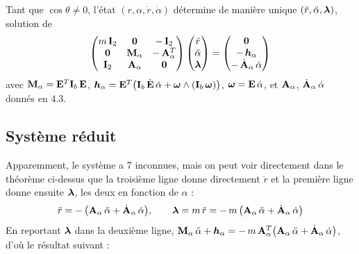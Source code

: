 \begin{theoreme}
    Tant que $\cos\theta \neq 0$, l'état $(r,\alpha,\dot r,\dot\alpha)$
    détermine de manière unique $(\ddot r,\ddot\alpha,\bm{\lambda})$,
    solution de
    \[
        \begin{pmatrix}
            m\,\mathbf{I}_2 & \mathbf{0} & -\,\mathbf{I}_2\\
            \mathbf{0} & \mathbf{M}_\alpha & -\,\mathbf{A}_\alpha^T\\
            \mathbf{I}_2 & \mathbf{A}_\alpha & \mathbf{0}
        \end{pmatrix}
        \begin{pmatrix}
            \ddot r\\ \ddot\alpha\\ \bm{\lambda}
        \end{pmatrix}
        = \begin{pmatrix}
            \bm{0}\\
            -\,\bm{h}_\alpha\\
            -\,\dot{\mathbf{A}}_\alpha\,\dot\alpha
        \end{pmatrix}
    \]
    avec $\mathbf{M}_\alpha = \mathbf{E}^T\mathbf{I}_b\,\mathbf{E}$,
    $\bm{h}_\alpha = \mathbf{E}^T\bigl(\mathbf{I}_b\,\dot{\mathbf{E}}\,\dot\alpha
    + \bm{\omega}\wedge(\mathbf{I}_b\,\bm{\omega})\bigr)$,
    $\bm{\omega} = \mathbf{E}\,\dot\alpha$, et $\mathbf{A}_\alpha$,
    $\dot{\mathbf{A}}_\alpha\,\dot\alpha$ donnés en 4.3.
\end{theoreme}

\subsection{Système réduit}

Apparemment, le système a 7 inconnues, mais on peut voir directement dans le théorème ci-dessus que la troisième ligne donne directement $\ddot{r}$ et la première ligne donne ensuite $\bm{\lambda}$, les deux en fonction de $\alpha$ : 
\[
    \ddot r = -\,\bigl(\mathbf{A}_\alpha\,\ddot\alpha
    + \dot{\mathbf{A}}_\alpha\,\dot\alpha\bigr),
    \qquad
    \bm{\lambda} = m\,\ddot r
    = -\,m\,\bigl(\mathbf{A}_\alpha\,\ddot\alpha
    + \dot{\mathbf{A}}_\alpha\,\dot\alpha\bigr)
\]
En reportant $\bm{\lambda}$ dans la deuxième ligne,
$\mathbf{M}_\alpha\,\ddot\alpha + \bm{h}_\alpha
= -\,m\,\mathbf{A}_\alpha^T\bigl(\mathbf{A}_\alpha\,\ddot\alpha
+ \dot{\mathbf{A}}_\alpha\,\dot\alpha\bigr)$, d'où le résultat suivant : 


